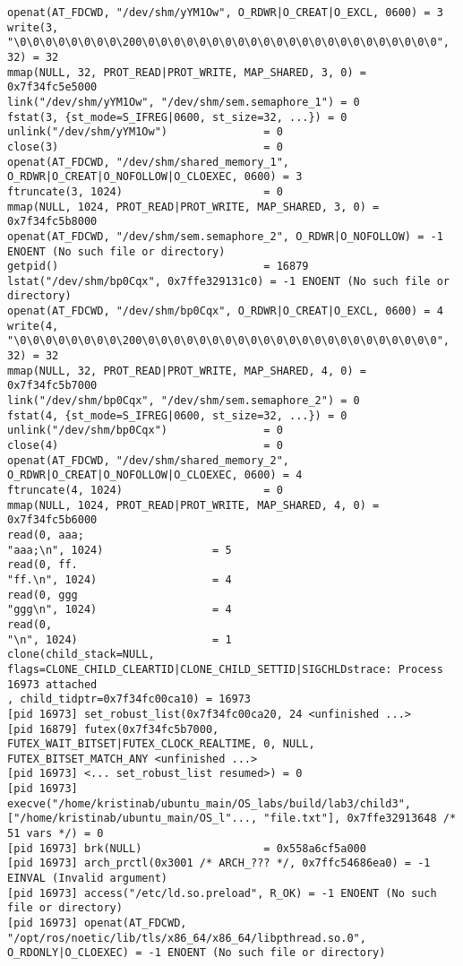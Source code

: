 \documentclass[a4paper, 12pt]{article}
\begin{document}
\begin{lstlisting}
openat(AT_FDCWD, "/dev/shm/yYM1Ow", O_RDWR|O_CREAT|O_EXCL, 0600) = 3
write(3, "\0\0\0\0\0\0\0\0\200\0\0\0\0\0\0\0\0\0\0\0\0\0\0\0\0\0\0\0\0\0\0\0", 32) = 32
mmap(NULL, 32, PROT_READ|PROT_WRITE, MAP_SHARED, 3, 0) = 0x7f34fc5e5000
link("/dev/shm/yYM1Ow", "/dev/shm/sem.semaphore_1") = 0
fstat(3, {st_mode=S_IFREG|0600, st_size=32, ...}) = 0
unlink("/dev/shm/yYM1Ow")               = 0
close(3)                                = 0
openat(AT_FDCWD, "/dev/shm/shared_memory_1", O_RDWR|O_CREAT|O_NOFOLLOW|O_CLOEXEC, 0600) = 3
ftruncate(3, 1024)                      = 0
mmap(NULL, 1024, PROT_READ|PROT_WRITE, MAP_SHARED, 3, 0) = 0x7f34fc5b8000
openat(AT_FDCWD, "/dev/shm/sem.semaphore_2", O_RDWR|O_NOFOLLOW) = -1 ENOENT (No such file or directory)
getpid()                                = 16879
lstat("/dev/shm/bp0Cqx", 0x7ffe329131c0) = -1 ENOENT (No such file or directory)
openat(AT_FDCWD, "/dev/shm/bp0Cqx", O_RDWR|O_CREAT|O_EXCL, 0600) = 4
write(4, "\0\0\0\0\0\0\0\0\200\0\0\0\0\0\0\0\0\0\0\0\0\0\0\0\0\0\0\0\0\0\0\0", 32) = 32
mmap(NULL, 32, PROT_READ|PROT_WRITE, MAP_SHARED, 4, 0) = 0x7f34fc5b7000
link("/dev/shm/bp0Cqx", "/dev/shm/sem.semaphore_2") = 0
fstat(4, {st_mode=S_IFREG|0600, st_size=32, ...}) = 0
unlink("/dev/shm/bp0Cqx")               = 0
close(4)                                = 0
openat(AT_FDCWD, "/dev/shm/shared_memory_2", O_RDWR|O_CREAT|O_NOFOLLOW|O_CLOEXEC, 0600) = 4
ftruncate(4, 1024)                      = 0
mmap(NULL, 1024, PROT_READ|PROT_WRITE, MAP_SHARED, 4, 0) = 0x7f34fc5b6000
read(0, aaa;
"aaa;\n", 1024)                 = 5
read(0, ff.
"ff.\n", 1024)                  = 4
read(0, ggg
"ggg\n", 1024)                  = 4
read(0, 
"\n", 1024)                     = 1
clone(child_stack=NULL, flags=CLONE_CHILD_CLEARTID|CLONE_CHILD_SETTID|SIGCHLDstrace: Process 16973 attached
, child_tidptr=0x7f34fc00ca10) = 16973
[pid 16973] set_robust_list(0x7f34fc00ca20, 24 <unfinished ...>
[pid 16879] futex(0x7f34fc5b7000, FUTEX_WAIT_BITSET|FUTEX_CLOCK_REALTIME, 0, NULL, FUTEX_BITSET_MATCH_ANY <unfinished ...>
[pid 16973] <... set_robust_list resumed>) = 0
[pid 16973] execve("/home/kristinab/ubuntu_main/OS_labs/build/lab3/child3", ["/home/kristinab/ubuntu_main/OS_l"..., "file.txt"], 0x7ffe32913648 /* 51 vars */) = 0
[pid 16973] brk(NULL)                   = 0x558a6cf5a000
[pid 16973] arch_prctl(0x3001 /* ARCH_??? */, 0x7ffc54686ea0) = -1 EINVAL (Invalid argument)
[pid 16973] access("/etc/ld.so.preload", R_OK) = -1 ENOENT (No such file or directory)
[pid 16973] openat(AT_FDCWD, "/opt/ros/noetic/lib/tls/x86_64/x86_64/libpthread.so.0", O_RDONLY|O_CLOEXEC) = -1 ENOENT (No such file or directory)

\end{lstlisting}
\end{document}
